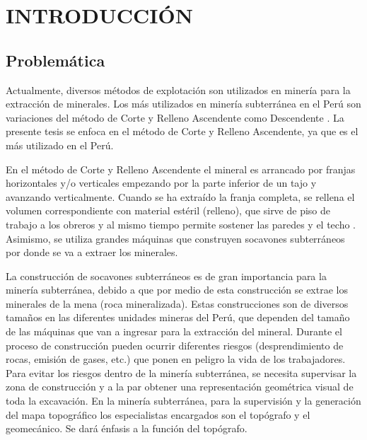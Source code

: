 \chapter{INTRODUCCIÓN}

\section{Problemática}

Actualmente, diversos métodos de explotación son utilizados en minería para la extracción de minerales. Los más utilizados en minería subterránea en el Perú son variaciones del método de Corte y Relleno Ascendente como Descendente \cite{Cruz2012}. La presente tesis se enfoca en el método de Corte y Relleno Ascendente, ya que es el más utilizado en el Perú. 

En el método de Corte y Relleno Ascendente el mineral es arrancado por franjas horizontales y/o verticales empezando por la parte inferior de un tajo y avanzando verticalmente. Cuando se ha extraído la franja completa, se rellena el volumen correspondiente con material estéril (relleno), que sirve de piso de trabajo a los obreros y al mismo tiempo permite sostener las paredes y el techo \cite{MunozDelPino2012}. Asimismo, se utiliza grandes máquinas que construyen socavones subterráneos por donde se va a extraer los minerales. 

La construcción de socavones subterráneos es de gran importancia para la minería subterránea, debido a que por medio de esta construcción se extrae los minerales de la mena (roca mineralizada). Estas construcciones son de diversos tamaños  en las diferentes unidades mineras del Perú, que dependen del tamaño de las máquinas que van a ingresar para la extracción del mineral. Durante el proceso de construcción pueden ocurrir diferentes riesgos (desprendimiento de rocas, emisión de gases, etc.) que ponen en peligro la vida de los trabajadores. Para evitar los riesgos dentro de la minería subterránea, se necesita supervisar la zona de construcción y a la par obtener una representación geométrica visual de toda la excavación. En la minería subterránea, para la supervisión y la generación del mapa topográfico los especialistas encargados son el topógrafo y el geomecánico. Se dará énfasis a la función del topógrafo. 

